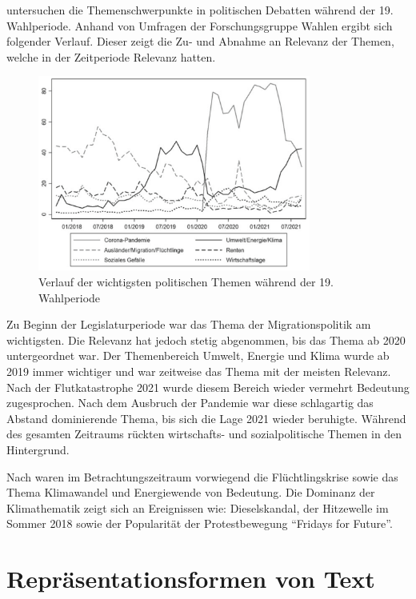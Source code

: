 \textcite{engler_wettbewerb_2022} untersuchen die Themenschwerpunkte in politischen Debatten während der \num{19}. Wahlperiode. Anhand von Umfragen der Forschungsgruppe Wahlen ergibt sich folgender Verlauf. Dieser zeigt die Zu- und Abnahme an Relevanz der Themen, welche in der Zeitperiode Relevanz hatten.

\begin{figure}[H]
    \centering
    \includegraphics[width=0.8\textwidth]{data/images/themenkonjunktur.png}
    \caption{Verlauf der wichtigsten politischen Themen während der 19. Wahlperiode \autocite{engler_wettbewerb_2022, forschungsgruppe_wahlen_forschungsgruppe_nodate}} \label{fig:themenkonjunktur}
\end{figure}

Zu Beginn der Legislaturperiode war das Thema der Migrationspolitik am wichtigsten. Die Relevanz hat jedoch stetig abgenommen, bis das Thema ab \num{2020} untergeordnet war. Der Themenbereich Umwelt, Energie und Klima wurde ab \num{2019} immer wichtiger und war zeitweise das Thema mit der meisten Relevanz. Nach der Flutkatastrophe \num{2021} wurde diesem Bereich wieder vermehrt Bedeutung zugesprochen. Nach dem Ausbruch der Pandemie war diese schlagartig das Abstand dominierende Thema, bis sich die Lage \num{2021} wieder beruhigte. Während des gesamten Zeitraums rückten wirtschafts- und sozialpolitische Themen in den Hintergrund.

Nach \textcite{niedermayer_entwicklung_2020} waren im Betrachtungszeitraum vorwiegend die Flüchtlingskrise sowie das Thema Klimawandel und Energiewende von Bedeutung. Die Dominanz der Klimathematik zeigt sich an Ereignissen wie: Dieselskandal, der Hitzewelle im Sommer \num{2018} sowie der Popularität der Protestbewegung \enquote{Fridays for Future}.

\section{Repräsentationsformen von Text} \label{sec:representationForms}

